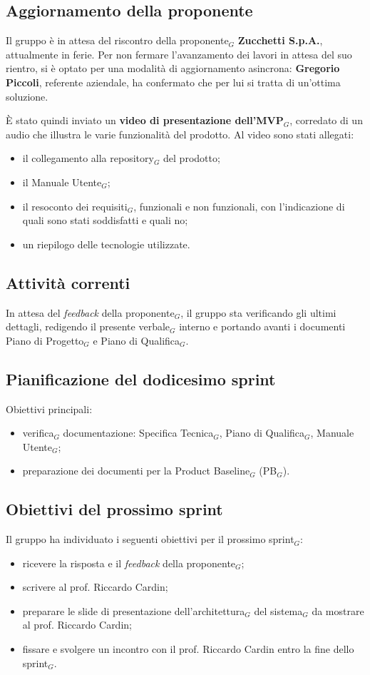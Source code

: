 \documentclass[a4paper, 10pt, colorlinks=true, linkcolor=black, urlcolor=blue, citecolor=blue, hidelinks]{article}
\begin{document}
\subsection{Aggiornamento della proponente}
Il gruppo è in attesa del riscontro della proponente$_G$ \textbf{Zucchetti S.p.A.}, attualmente in ferie. Per non fermare l'avanzamento dei lavori in attesa del suo rientro, si è optato per una modalità di aggiornamento asincrona: \textbf{Gregorio Piccoli}, referente aziendale, ha confermato che per lui si tratta di un'ottima soluzione.

\noindent È stato quindi inviato un \textbf{video di presentazione dell'MVP$_G$}, corredato di un audio che illustra le varie funzionalità del prodotto. Al video sono stati allegati:
\begin{itemize}
    \item il collegamento alla repository$_G$ del prodotto;
    \item il Manuale Utente$_G$;
    \item il resoconto dei requisiti$_G$, funzionali e non funzionali, con l'indicazione di quali sono stati soddisfatti e quali no;
    \item un riepilogo delle tecnologie utilizzate.
\end{itemize}

\subsection{Attività correnti}
In attesa del \textit{feedback} della proponente$_G$, il gruppo sta verificando gli ultimi dettagli, redigendo il presente verbale$_G$ interno e portando avanti i documenti Piano di Progetto$_G$ e Piano di Qualifica$_G$.

\subsection{Pianificazione del dodicesimo sprint}
Obiettivi principali:
\begin{itemize}
    \item verifica$_G$ documentazione: Specifica Tecnica$_G$, Piano di Qualifica$_G$, Manuale Utente$_G$;
    \item preparazione dei documenti per la Product Baseline$_G$ (PB$_G$).
\end{itemize}

\subsection{Obiettivi del prossimo sprint}
Il gruppo ha individuato i seguenti obiettivi per il prossimo sprint$_G$:
\begin{itemize}
    \item ricevere la risposta e il \textit{feedback} della proponente$_G$;
    \item scrivere al prof. Riccardo Cardin;
    \item preparare le slide di presentazione dell'architettura$_G$ del sistema$_G$ da mostrare al prof. Riccardo Cardin;
    \item fissare e svolgere un incontro con il prof. Riccardo Cardin entro la fine dello sprint$_G$.
\end{itemize}
\end{document}

